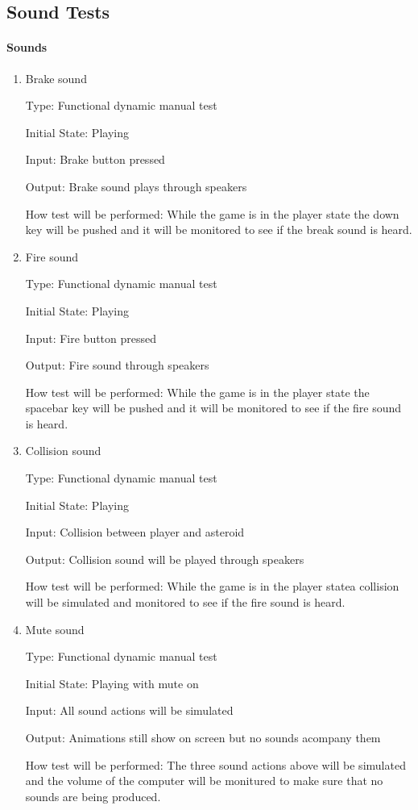 \documentclass[12pt, titlepage]{article}
\begin{document}
\subsection{Sound Tests}

\paragraph{Sounds}

\begin{enumerate}
\item{Brake sound\\}

Type: Functional dynamic manual test

Initial State: Playing

Input: Brake button pressed

Output: Brake sound plays through speakers

How test will be performed: While the game is in the player state the down key will be pushed and it will be monitored to see if the break sound is heard.

\item{Fire sound\\}

Type: Functional dynamic manual test

Initial State: Playing

Input: Fire button pressed

Output: Fire sound through speakers

How test will be performed: While the game is in the player state the spacebar key will be pushed and it will be monitored to see if the fire sound is heard.

\item{Collision sound\\}

Type: Functional dynamic manual test

Initial State: Playing

Input: Collision between player and asteroid

Output: Collision sound will be played through speakers

How test will be performed: While the game is in the player statea collision will be simulated and monitored to see if the fire sound is heard.

\item{Mute sound\\}

Type: Functional dynamic manual test

Initial State: Playing with mute on

Input: All sound actions will be simulated

Output: Animations still show on screen but no sounds acompany them

How test will be performed: The three sound actions above will be simulated and the volume of the computer will be monitured to make sure that no sounds are being produced.

\end{enumerate}
\end{document}
